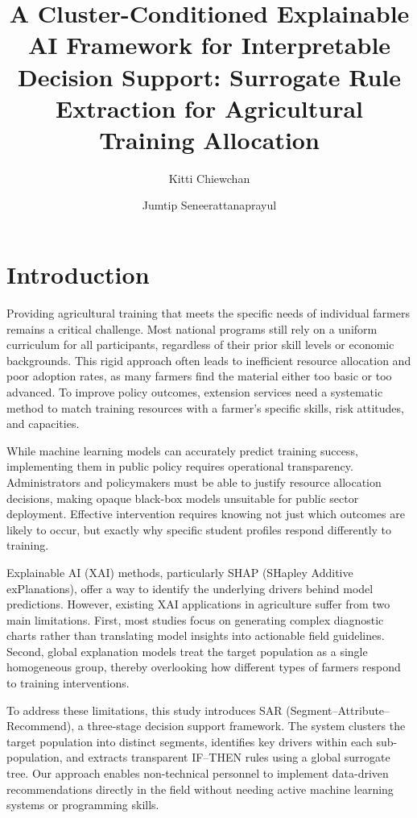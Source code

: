 \documentclass[fleqn,10pt,lineno]{wlpeerj}
\title{A Cluster-Conditioned Explainable AI Framework for Interpretable Decision Support: Surrogate Rule Extraction for Agricultural Training Allocation}
\author[1]{Kitti Chiewchan}
\author[2]{Jumtip Seneerattanaprayul}
\affil[1]{Computer Education Program, Faculty of Education, Bansomdejchaopraya Rajabhat University, Bangkok, Thailand}
\affil[2]{Department of Agricultural and Resource Economics, Faculty of Economics, Kasetsart University, Bangkok, Thailand}
\begin{document}
\flushbottom
\maketitle
\thispagestyle{empty}

\section*{Introduction}
Providing agricultural training that meets the specific needs of individual farmers remains a critical challenge. Most national programs still rely on a uniform curriculum for all participants, regardless of their prior skill levels or economic backgrounds. This rigid approach often leads to inefficient resource allocation and poor adoption rates, as many farmers find the material either too basic or too advanced. To improve policy outcomes, extension services need a systematic method to match training resources with a farmer's specific skills, risk attitudes, and capacities.

While machine learning models can accurately predict training success, implementing them in public policy requires operational transparency. Administrators and policymakers must be able to justify resource allocation decisions, making opaque black-box models unsuitable for public sector deployment. Effective intervention requires knowing not just which outcomes are likely to occur, but exactly why specific student profiles respond differently to training.

Explainable AI (XAI) methods, particularly SHAP (SHapley Additive exPlanations), offer a way to identify the underlying drivers behind model predictions. However, existing XAI applications in agriculture suffer from two main limitations. First, most studies focus on generating complex diagnostic charts rather than translating model insights into actionable field guidelines. Second, global explanation models treat the target population as a single homogeneous group, thereby overlooking how different types of farmers respond to training interventions.

To address these limitations, this study introduces SAR (Segment--Attribute--Recommend), a three-stage decision support framework. The system clusters the target population into distinct segments, identifies key drivers within each sub-population, and extracts transparent IF--THEN rules using a global surrogate tree. Our approach enables non-technical personnel to implement data-driven recommendations directly in the field without needing active machine learning systems or programming skills.
\end{document}
